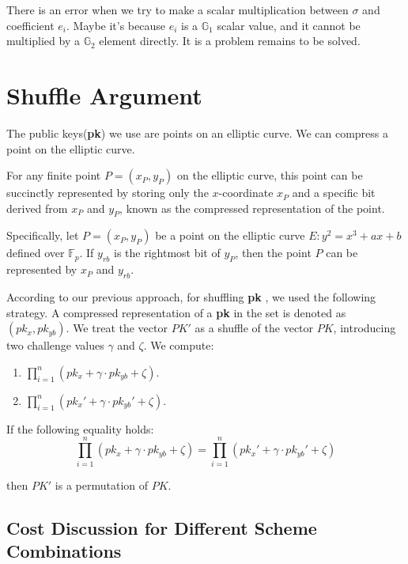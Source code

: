 \documentclass{article}
\begin{document}
There is an error when we try to make a scalar multiplication between $\sigma$ and coefficient $e_i$. Maybe it's because $e_i$ is a $\mathbb{G}_1$ scalar value, and it cannot be multiplied by a $\mathbb{G}_2$ element directly. It is a problem remains to be solved.


\section{Shuffle Argument}

The public keys(\textbf{pk}) we use are points on an elliptic curve. We can compress a point on the elliptic curve.

For any finite point \( P = (x_P, y_P) \) on the elliptic curve, this point can be succinctly represented by storing only the \( x \)-coordinate \( x_P \) and a specific bit derived from \( x_P \) and \( y_P \), known as the compressed representation of the point.

Specifically, let \( P = (x_P, y_P) \) be a point on the elliptic curve \( E: y^2 = x^3 + ax + b \) defined over \( \mathbb{F}_p \). If \( y_{rb} \) is the rightmost bit of \( y_P \), then the point \( P \) can be represented by \( x_P \) and \( y_{rb} \).

According to our previous approach, for shuffling \textbf{pk} , we used the following strategy. A compressed representation of a \textbf{pk} in the set is denoted as \( (pk_x, pk_{yb}) \). We treat the vector \( PK' \) as a shuffle of the vector \( PK \), introducing two challenge values \( \gamma \) and \( \zeta \). We compute:

\begin{enumerate}
    \item \( \prod_{i=1}^{n} (pk_x + \gamma \cdot pk_{yb} + \zeta) \).
    \item \( \prod_{i=1}^{n} (pk_x' + \gamma \cdot pk_{yb}' + \zeta) \).
\end{enumerate}

If the following equality holds:
\[
\prod_{i=1}^{n} (pk_x + \gamma \cdot pk_{yb} + \zeta) = \prod_{i=1}^{n} (pk_x' + \gamma \cdot pk_{yb}' + \zeta)
\]

then \( PK' \) is a permutation of \( PK \).

\subsection{Cost Discussion for Different Scheme Combinations}
\end{document}
